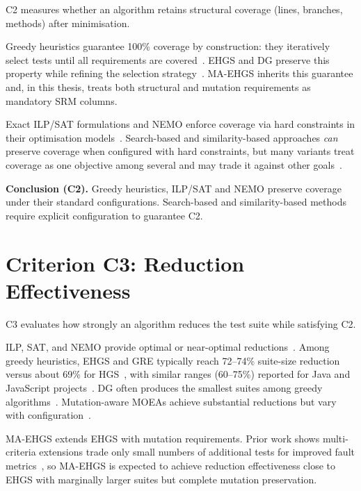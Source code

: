 C2 measures whether an algorithm retains structural coverage (lines, branches, methods) after minimisation.

Greedy heuristics guarantee 100\% coverage by construction: they iteratively select tests until all requirements are covered~\cite{harrold1993,chen2005,yoo2012,noemmer2020}. EHGS and DG preserve this property while refining the selection strategy~\cite{tallam2005,gladston2015}. MA-EHGS inherits this guarantee and, in this thesis, treats both structural and mutation requirements as mandatory SRM columns.

Exact ILP/SAT formulations and NEMO enforce coverage via hard constraints in their optimisation models~\cite{elbaum2002,yoo2012,lin2018}. Search-based and similarity-based approaches \emph{can} preserve coverage when configured with hard constraints, but many variants treat coverage as one objective among several and may trade it against other goals~\cite{yoo2012,khan2020,wei2017,bach2017}.

\textbf{Conclusion (C2).} Greedy heuristics, ILP/SAT and NEMO preserve coverage under their standard configurations. Search-based and similarity-based methods require explicit configuration to guarantee C2.

\section{Criterion C3: Reduction Effectiveness}

C3 evaluates how strongly an algorithm reduces the test suite while satisfying C2.

ILP, SAT, and NEMO provide optimal or near-optimal reductions~\cite{rothermel1998,elbaum2002,lin2018}. Among greedy heuristics, EHGS and GRE typically reach 72--74\% suite-size reduction versus about 69\% for HGS~\cite{gladston2015}, with similar ranges (60--75\%) reported for Java and JavaScript projects~\cite{noemmer2020,jehan2023}. DG often produces the smallest suites among greedy algorithms~\cite{tallam2005}. Mutation-aware MOEAs achieve substantial reductions but vary with configuration~\cite{wei2017}.

MA-EHGS extends EHGS with mutation requirements. Prior work shows multi-criteria extensions trade only small numbers of additional tests for improved fault metrics~\cite{lin2018,shi2018}, so MA-EHGS is expected to achieve reduction effectiveness close to EHGS with marginally larger suites but complete mutation preservation.

